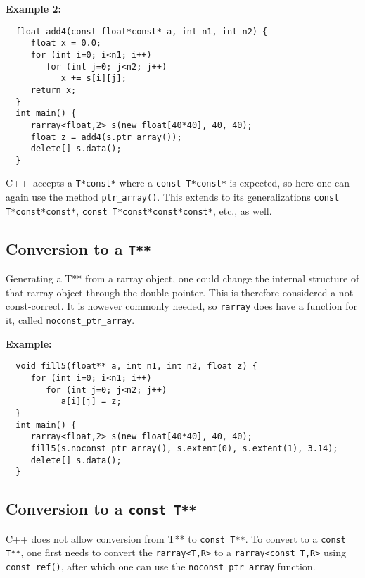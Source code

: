 \documentclass[12pt,twoside]{article}
\newcommand{\cxx}{C{++}}
\begin{document}
\noindent
{\bf Example 2:}
\vspace{-5pt}\begin{framed}\vspace{-14pt}%
\begin{verbatim}
  float add4(const float*const* a, int n1, int n2) {
     float x = 0.0;
     for (int i=0; i<n1; i++)
        for (int j=0; j<n2; j++)
           x += s[i][j];
     return x;
  }
  int main() {
     rarray<float,2> s(new float[40*40], 40, 40);
     float z = add4(s.ptr_array());
     delete[] s.data();
  }
\end{verbatim}\vspace{-14pt}
\end{framed}

\noindent
\cxx\ accepts a \texttt{T*const*} where a \texttt{const T*const*} is expected, so here one can again use the method \texttt{ptr\_array()}.
This extends to its generalizations \texttt{const T*const*const*}, \texttt{const T*const*const*const*}, etc., as well.


\subsection{Conversion to a {\tt T**}}

\noindent
Generating a T** from a rarray object, one could change the internal structure of that rarray object through the double pointer.  This is therefore considered a not const-correct.  It is however commonly needed, so \texttt{rarray} does have a function for it, called \texttt{noconst\_ptr\_array}. 

\noindent
{\bf Example:}
\vspace{-5pt}\begin{framed}\vspace{-14pt}%
\begin{verbatim}
  void fill5(float** a, int n1, int n2, float z) {
     for (int i=0; i<n1; i++)
        for (int j=0; j<n2; j++)
           a[i][j] = z;
  }
  int main() {
     rarray<float,2> s(new float[40*40], 40, 40);
     fill5(s.noconst_ptr_array(), s.extent(0), s.extent(1), 3.14);
     delete[] s.data();
  }
\end{verbatim}\vspace{-14pt}
\end{framed}

\subsection{Conversion to a {\tt const T**}}
\noindent
C++ does not allow conversion from T** to \texttt{const T**}. To convert to a \texttt{const T**}, one first needs to convert the \texttt{rarray{\tt<}T,R{\tt>}} to a \texttt{rarray{\tt<}const T,R{\tt>}} using \texttt{const\_ref()}, after which one can use the \texttt{noconst\_ptr\_array} function.
\end{document}

